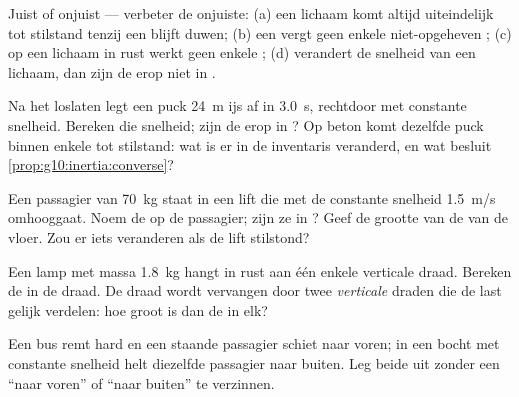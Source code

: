 \begin{exercise}[$\star$]\label{exo:g10:inertia:5}
Juist of onjuist --- verbeter de onjuiste: (a) een lichaam komt altijd
uiteindelijk tot stilstand tenzij een  blijft duwen; (b) een
 vergt geen enkele niet-opgeheven ;
(c) op een lichaam in rust werkt geen enkele ; (d) verandert de
snelheid van een lichaam, dan zijn de  erop niet in .
\end{exercise}

\begin{exercise}[$\star\star$]\label{exo:g10:inertia:6}
Na het loslaten legt een puck \qty{24}{m} ijs af in \qty{3.0}{s},
rechtdoor met constante snelheid. Bereken die snelheid; zijn de 
erop in ? Op beton komt dezelfde puck binnen enkele  tot
stilstand: wat is er in de inventaris veranderd, en wat besluit
\cref{prop:g10:inertia:converse}?
\end{exercise}

\begin{exercise}[$\star\star$]\label{exo:g10:inertia:7}
Een passagier van \qty{70}{kg} staat in een lift die met de constante
snelheid \qty{1.5}{m/s} omhooggaat. Noem de  op de passagier;
zijn ze in ? Geef de grootte van de  van de vloer. Zou er
iets veranderen als de lift stilstond?
\end{exercise}

\begin{exercise}[$\star\star$]\label{exo:g10:inertia:8}
Een lamp met massa \qty{1.8}{kg} hangt in rust aan één enkele verticale
draad. Bereken de  in de draad. De draad wordt vervangen door
twee \emph{verticale} draden die de last gelijk verdelen: hoe groot is
dan de  in elk?
\end{exercise}

\begin{exercise}[$\star\star$]\label{exo:g10:inertia:9}
Een bus remt hard en een staande passagier schiet naar voren; in een
bocht met constante snelheid helt diezelfde passagier naar buiten. Leg
beide uit zonder een  ``naar voren'' of ``naar buiten'' te
verzinnen.
\end{exercise}

